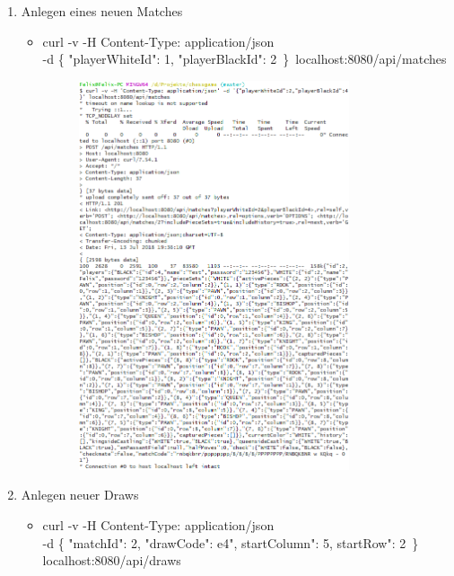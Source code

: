 \begin{enumerate}
\begin{itemize}
\begin{figure}[h]
			\end{figure}
		\end{itemize}
	\item Anlegen eines neuen Matches
		\begin{itemize}
			\item curl -v -H \textquotesingle Content-Type: application/json\textquotesingle\\-d \textquotesingle\{ "playerWhiteId": 1, "playerBlackId": 2\ \}\textquotesingle\ localhost:8080/api/matches
			\begin{figure}[h]
				\includegraphics[width=0.8\textwidth]{images/question7.png}
			\end{figure}
		\end{itemize}
	\item Anlegen neuer Draws
		\begin{itemize}
			\item curl -v -H \textquotesingle Content-Type: application/json\textquotesingle\\-d \textquotesingle\{ "matchId": 2, "drawCode": \textquotesingle\textquotesingle e4", \textquotesingle\textquotesingle startColumn": 5, \textquotesingle\textquotesingle startRow": 2\ \}\textquotesingle\\localhost:8080/api/draws

\end{itemize}
\end{enumerate}
